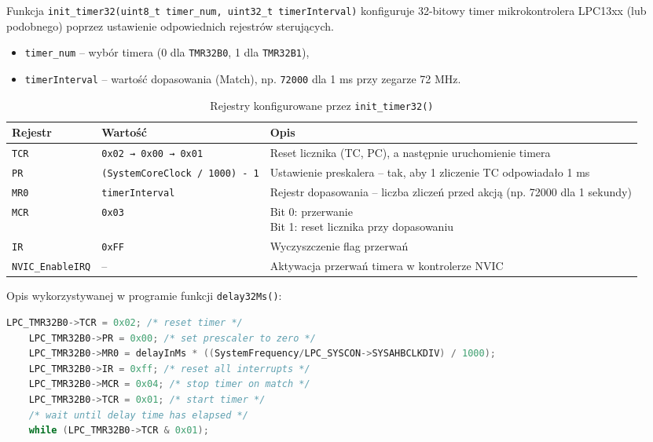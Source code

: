 \documentclass[a4paper,12pt]{report}
\begin{document}
Funkcja \texttt{init\_timer32(uint8\_t timer\_num, uint32\_t timerInterval)} konfiguruje 32-bitowy timer mikrokontrolera LPC13xx (lub podobnego) poprzez ustawienie odpowiednich rejestrów sterujących.

\begin{itemize}
    \item \texttt{timer\_num} – wybór timera (0 dla \texttt{TMR32B0}, 1 dla \texttt{TMR32B1}),
    \item \texttt{timerInterval} – wartość dopasowania (Match), np. \texttt{72000} dla 1 ms przy zegarze 72 MHz.
\end{itemize}

\begin{table}[h!]
\centering
{
    \small
    \begin{tabularx}{\textwidth}{|l|p{4cm}|X|}
    \hline
    \textbf{Rejestr} & \textbf{Wartość} & \textbf{Opis} \\
    \hline
    \texttt{TCR} & \texttt{0x02 → 0x00 → 0x01} & Reset licznika (TC, PC), a następnie uruchomienie timera \\
    \hline
    \texttt{PR} & \texttt{(SystemCoreClock / 1000) - 1} & Ustawienie preskalera – tak, aby 1 zliczenie TC odpowiadało 1 ms \\
    \hline
    \texttt{MR0} & \texttt{timerInterval} & Rejestr dopasowania – liczba zliczeń przed akcją (np. 72000 dla 1 sekundy) \\
    \hline
    \texttt{MCR} & \texttt{0x03} & \makecell[l]{Bit 0: przerwanie \\ Bit 1: reset licznika przy dopasowaniu} \\
    \hline
    \texttt{IR} & \texttt{0xFF} & Wyczyszczenie flag przerwań \\
    \hline
    \texttt{NVIC\_EnableIRQ} & -- & Aktywacja przerwań timera w kontrolerze NVIC \\
    \hline
    \end{tabularx}
}
\caption{Rejestry konfigurowane przez \texttt{init\_timer32()}}
\end{table}

Opis wykorzystywanej w programie funkcji \texttt{delay32Ms()}:\\
\begin{lstlisting}[language=C]
    LPC_TMR32B0->TCR = 0x02; /* reset timer */
    LPC_TMR32B0->PR = 0x00; /* set prescaler to zero */
    LPC_TMR32B0->MR0 = delayInMs * ((SystemFrequency/LPC_SYSCON->SYSAHBCLKDIV) / 1000);
    LPC_TMR32B0->IR = 0xff; /* reset all interrupts */
    LPC_TMR32B0->MCR = 0x04; /* stop timer on match */
    LPC_TMR32B0->TCR = 0x01; /* start timer */
    /* wait until delay time has elapsed */
    while (LPC_TMR32B0->TCR & 0x01);
\end{lstlisting}
\end{document}
